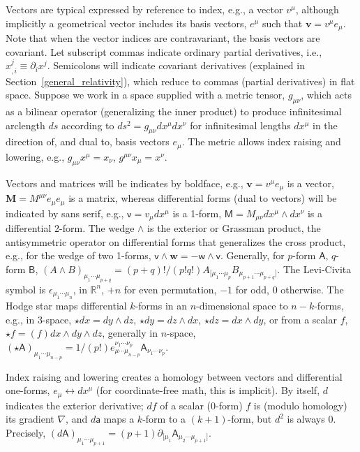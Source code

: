 Vectors are typical expressed by reference to index, e.g., a vector $v^\mu$, although implicitly a geometrical vector includes its basis vectors, $e^\mu$ such that $\textbf{v} = v^\mu e_\mu$.
Note that when the vector indices are contravariant, the basis vectors are covariant.
Let subscript commas indicate ordinary partial derivatives, i.e., $x_{,i}^j \equiv \partial_i x^j$.
Semicolons will indicate covariant derivatives (explained in Section~\ref{general_relativity}), which reduce to commas (partial derivatives) in flat space. 
Suppose we work in a space supplied with a metric tensor, $g_{\mu\nu}$, which acts as a bilinear operator (generalizing the inner product) to produce infinitesimal arclength $ds$ according to $ds^2 = g_{\mu \nu} dx^\mu dx^\nu$ for infinitesimal lengths $dx^\mu$ in the direction of, and dual to, basis vectors $e_\mu$. 
The metric allows index raising and lowering, e.g., $g_{\mu \nu} x^\mu = x_\nu$, $g^{\mu \nu} x_\mu = x^\nu$.

Vectors and matrices will be indicates by boldface, e.g., $\textbf{v} = v^\mu e_\mu$ is a vector, $\textbf{M} = M^{\mu\nu} e_\mu e_\mu $ is a matrix, whereas differential forms (dual to vectors) will be indicated by sans serif, e.g., $\textsf{v} = v_\mu dx^\mu$ is a 1-form, $\textsf{M} = M_{\mu\nu} dx^\mu \wedge dx^\nu$ is a differential 2-form.
The wedge $\wedge$ is the exterior or Grassman product, the antisymmetric operator on differential forms that generalizes the cross product, e.g., for the wedge of two 1-forms, $\textsf{v} \wedge \textbf{w} = -\textsf{w} \wedge \textsf{v}$.
Generally, for $p$-form $\textsf{A}$, $q$-form $\textsf{B}$, $(A \wedge B)_{\mu_1 \cdots \mu_{p+q}} = (p+q)!/(p!q!) A_{[\mu_1\cdots\mu_p} B_{\mu_{p+1} \cdots \mu_{p+q} ]}$. 
The Levi-Civita symbol is $\epsilon_{\mu_1 \cdots \mu_n}$, in $\mathbb{R}^n$, $+n$ for even permutation, $-1$ for odd, $0$ otherwise.
The Hodge star maps differential $k$-forms in an $n$-dimensional space to $n-k$-forms, e.g., in 3-space, $\star dx = dy \wedge dz$, $\star dy = dz \wedge dx$, $\star dz = dx \wedge dy$, or from a scalar $f$, $\star f = (f) dx \wedge dy \wedge dz$, generally in $n$-space, $(\star \textsf{A})_{\mu_1 \cdots \mu_{n-p}} = 1/(p!) e^{\nu_1 \cdots \nu_p}_{\mu \cdots \mu_{n-p}} \textsf{A}_{\nu_1 \cdots \nu_p}$.

Index raising and lowering creates a homology between vectors and differential one-forms, $e_\mu \leftrightarrow dx^\mu$ (for coordinate-free math, this is implicit).
By itself, $d$ indicates the exterior derivative; $df$ of a scalar (0-form) $f$ is (modulo homology) its gradient $\nabla$, and $d\textsf{a}$ maps a $k$-form to a $(k+1)$-form, but $d^2$ is always 0.
Precisely, $(d\textsf{A})_{\mu_1 \cdots \mu_{p+1}} = (p+1) \partial_{[\mu_1} \textsf{A}_{\mu_2 \cdots \mu_{p+1}]}$. 


